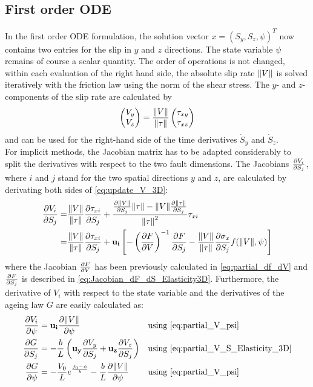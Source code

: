 \subsection{First order ODE}
In the first order ODE formulation, the solution vector $x = (S_y, S_z, \psi)^T$ now contains two entries for the slip in $y$ and $z$ directions. The state variable $\psi$ remains of course a scalar quantity. The order of operations is not changed, within each evaluation of the right hand side, the absolute slip rate $\norm{V}$ is solved iteratively with the friction law using the norm of the shear stress. The $y$- and $z$-components of the slip rate are calculated by 
\begin{equation}
	\label{eq:update_V_3D}
	\begin{pmatrix}
		V_y \\ V_z
	\end{pmatrix} = \frac{\norm{V}}{\norm{\tau}} \begin{pmatrix}
													\tau_{xy} \\ \tau_{xz}
												 \end{pmatrix}
\end{equation}
and can be used for the right-hand side of the time derivatives $\dot{S}_y$ and $\dot{S}_z$. \\
For implicit methods, the Jacobian matrix has to be adapted considerably to split the derivatives with respect to the two fault dimensions. The Jacobians $\pdv{V_i}{S_j}$, where $i$ and $j$ stand for the two spatial directions $y$ and $z$, are calculated by derivating both sides of \autoref{eq:update_V_3D}:
\begin{align}
	\pdv{V_i}{S_j} =& \frac{\norm{V}}{\norm{\tau}}\pdv{\tau_{xi}}{S_j} + \frac{\pdv{\norm{V}}{S_j}\norm{\tau}-\norm{V}\pdv{\norm{\tau}}{S_j}}{\norm{\tau}^2}\tau_{xi} \nonumber\\ 
	=& \frac{\norm{V}}{\norm{\tau}}\pdv{\tau_{xi}}{S_j} + \mathbf{u_i}\left[-\left(\pdv{F}{V}\right)^{-1}\pdv{F}{S_j} - \frac{\norm{V}}{\norm{\tau}}\pdv{\sigma_{x}}{S_j}f(\norm{V},\psi)\right] 
	\label{eq:partial_V_S_Elasticity_3D}
\end{align}
where the Jacobian $\pdv{F}{V}$ has been previously calculated in \autoref{eq:partial_df_dV} and $\pdv{F}{S_j}$ is described in \autoref{eq:Jacobian_dF_dS_Elasticity3D}. Furthermore, the derivative of $V_i$ with respect to the state variable and the derivatives of the ageing law $G$ are easily calculated as:
\begin{align}
	\label{eq:partial_dV_dpsi_elasticity_3D}
	\pdv{V_i}{\psi} &= \mathbf{u_i}\pdv{\norm{V}}{\psi} & &\text{using \autoref{eq:partial_V_psi}} \\
	\pdv{G}{S_j}    &= -\frac{b}{L}\left(\mathbf{u_y}\pdv{V_y}{S_j} + \mathbf{u_z}\pdv{V_z}{S_j}\right) & &\text{using \autoref{eq:partial_V_S_Elasticity_3D}} \\
	\pdv{G}{\psi}    &= -\frac{V_0}{L}e^{\frac{f_0 - \psi}{b}} -\frac{b}{L}\pdv{\norm{V}}{\psi} & & \text{using \autoref{eq:partial_V_psi}}
\end{align}

